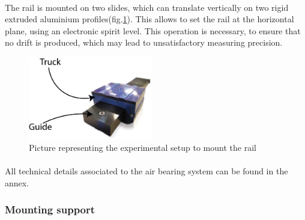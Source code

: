\paragraph{}
The rail is mounted on two slides, which can translate vertically on two rigid extruded aluminium profiles(fig.\ref{fig:setup_rail}). This allows to set the rail at the horizontal plane, using an electronic spirit level. This operation is necessary, to ensure that no drift is produced, which may lead to unsatisfactory measuring precision.
\begin{figure}[H] %
	\centering%
	\includegraphics[width=0.48\textwidth]{figures/Chapter_1/Airbearing.png}
	\caption{Picture representing the experimental setup to mount the rail}
	\label{fig:setup_rail}
\end{figure}

\paragraph{}
All technical details associated to the air bearing system can be found in the annex.
\subsubsection{Mounting support}
